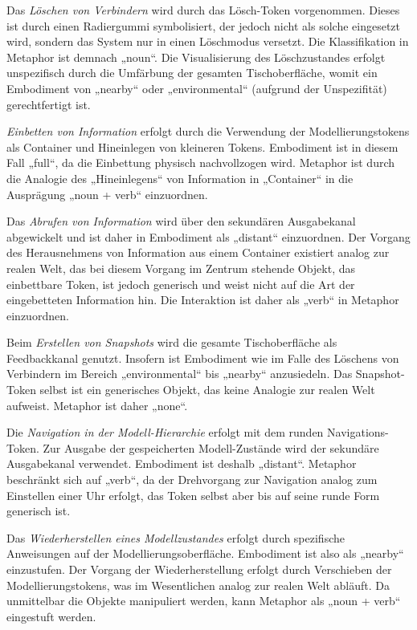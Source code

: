 Das \emph{Löschen von Verbindern} wird durch das Lösch-Token vorgenommen. Dieses ist durch einen Radiergummi symbolisiert, der jedoch nicht als solche eingesetzt wird, sondern das System nur in einen Löschmodus versetzt. Die Klassifikation in Metaphor ist demnach „noun“. Die Visualisierung des Löschzustandes erfolgt unspezifisch durch die Umfärbung der gesamten Tischoberfläche, womit ein Embodiment von „nearby“ oder „environmental“ (aufgrund der Unspezifität) gerechtfertigt ist.

\emph{Einbetten von Information} erfolgt durch die Verwendung der Modellierungstokens als Container und Hineinlegen von kleineren Tokens. Embodiment ist in diesem Fall „full“, da die Einbettung physisch nachvollzogen wird. Metaphor ist durch die Analogie des „Hineinlegens“ von Information in „Container“ in die Ausprägung „noun + verb“ einzuordnen.

Das \emph{Abrufen von Information} wird über den sekundären Ausgabekanal abgewickelt und ist daher in Embodiment als „distant“ einzuordnen. Der Vorgang des Herausnehmens von Information aus einem Container existiert analog zur realen Welt, das bei diesem Vorgang im Zentrum stehende Objekt, das einbettbare Token, ist jedoch generisch und weist nicht auf die Art der eingebetteten Information hin. Die Interaktion ist daher als „verb“ in Metaphor einzuordnen.

Beim \emph{Erstellen von Snapshots} wird die gesamte Tischoberfläche als Feedbackkanal genutzt. Insofern ist Embodiment wie im Falle des Löschens von Verbindern im Bereich „environmental“ bis „nearby“ anzusiedeln. Das Snapshot-Token selbst ist ein generisches Objekt, das keine Analogie zur realen Welt aufweist. Metaphor ist daher „none“.

Die \emph{Navigation in der Modell-Hierarchie} erfolgt mit dem runden Navigations-Token. Zur Ausgabe der gespeicherten Modell-Zustände wird der sekundäre Ausgabekanal
verwendet. Embodiment ist deshalb „distant“. Metaphor beschränkt sich auf „verb“, da der Drehvorgang zur Navigation analog zum Einstellen einer Uhr erfolgt, das Token selbst aber bis auf seine runde Form generisch ist.

Das \emph{Wiederherstellen eines Modellzustandes} erfolgt durch spezifische Anweisungen auf der Modellierungsoberfläche. Embodiment ist also als „nearby“ einzustufen. Der Vorgang der Wiederherstellung erfolgt durch Verschieben der Modellierungstokens, was im Wesentlichen analog zur realen Welt abläuft. Da unmittelbar die Objekte manipuliert werden, kann Metaphor als „noun + verb“ eingestuft werden.

